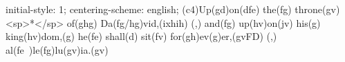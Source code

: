 initial-style: 1;
centering-scheme: english;
(c4)Up(gd)on(dfe) the(fg) throne(gv) <sp>*</sp> of(ghg) Da(fg/hg)vid,(ixhih) (,) and(fg) up(hv)on(jv) his(g) king(hv)dom,(g) he(fe) shall(d) sit(fv) for(gh)ev(g)er,(gvFD) (,) al(fe~)le(fg)lu(gv)ia.(gv)
